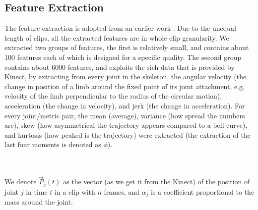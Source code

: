 \documentclass[11pt,twocolumn,varwidth=true,a4paper,fleqn]{sigchi}
\begin{document}
\subsection{Feature Extraction}
The feature extraction is adopted from an earlier work \cite{ran}.
Due to the unequal length of clips, all the extracted features are in whole clip 
granularity. We extracted two groups of features, the first is relatively
small, and contains about 100 features each of which is designed for a specific quality. The second group contains about 6000
features, and exploits the rich data that is provided by Kinect, by extracting from every joint in the skeleton, the angular velocity (the change in position of a limb around the fixed point of its joint attachment, e.g, velocity of the limb perpendicular to the radius of the circular motion), acceleration (the change in velocity), and jerk (the change in acceleration). For every joint/metric pair, the mean (average),
variance (how spread the numbers are), skew (how asymmetrical the trajectory appears compared to a bell curve), and kurtosis (how peaked is the trajectory) were extracted (the extraction of the last four
moments is denoted as $\phi$). 



\\\\We denote $\vec{P}_{j}(t)$ as the vector (as we get it from the Kinect) of
the position of joint $j$ in time $t$ in a clip with $n$ frames, and
$\alpha_{j}$ is a coefficient proportional to the mass around the joint. 
\end{document}
